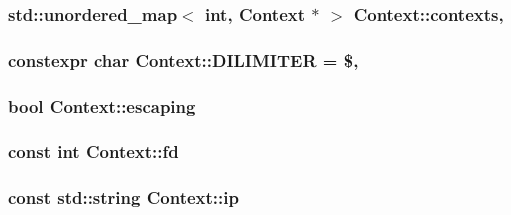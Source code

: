 \subsubsection[{\texorpdfstring{contexts}{contexts}}]{\setlength{\rightskip}{0pt plus 5cm}std\+::unordered\+\_\+map$<$ int, {\bf Context} $\ast$ $>$ Context\+::contexts\hspace{0.3cm}{\ttfamily [static]}, {\ttfamily [private]}}\hypertarget{classContext_abab3c078973688455f584747769f14fe}{}\label{classContext_abab3c078973688455f584747769f14fe}
\subsubsection[{\texorpdfstring{D\+I\+L\+I\+M\+I\+T\+ER}{DILIMITER}}]{\setlength{\rightskip}{0pt plus 5cm}constexpr char Context\+::\+D\+I\+L\+I\+M\+I\+T\+ER = \textquotesingle{}\$\textquotesingle{}\hspace{0.3cm}{\ttfamily [static]}, {\ttfamily [private]}}\hypertarget{classContext_a63a0ff9017aba4c0d9551900093ee057}{}\label{classContext_a63a0ff9017aba4c0d9551900093ee057}
\subsubsection[{\texorpdfstring{escaping}{escaping}}]{\setlength{\rightskip}{0pt plus 5cm}bool Context\+::escaping\hspace{0.3cm}{\ttfamily [private]}}\hypertarget{classContext_a5f34f6e7fc17f613087021f52e2154f9}{}\label{classContext_a5f34f6e7fc17f613087021f52e2154f9}
\subsubsection[{\texorpdfstring{fd}{fd}}]{\setlength{\rightskip}{0pt plus 5cm}const int Context\+::fd\hspace{0.3cm}{\ttfamily [private]}}\hypertarget{classContext_aaf11c36966be14b2e1e53ee43c8e91dd}{}\label{classContext_aaf11c36966be14b2e1e53ee43c8e91dd}
\subsubsection[{\texorpdfstring{ip}{ip}}]{\setlength{\rightskip}{0pt plus 5cm}const std\+::string Context\+::ip}\hypertarget{classContext_a3508ad395f4b0c7e61ad46b247307f50}{}\label{classContext_a3508ad395f4b0c7e61ad46b247307f50}
